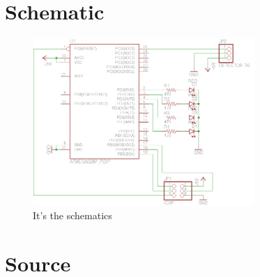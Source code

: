 \documentclass[a4paper]{article}
\begin{document}
    \section{Schematic}
    \begin{figure}[h]
        \centering
        \includegraphics[width=0.75\textwidth]{images/schematic}
        \caption{It's the schematics}
    \end{figure}


    \section{Source}
    
\end{document}
